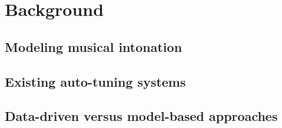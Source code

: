 \chapter{Background}

\section{Modeling musical intonation}

\section{Existing auto-tuning systems}

\section{Data-driven versus model-based approaches}

